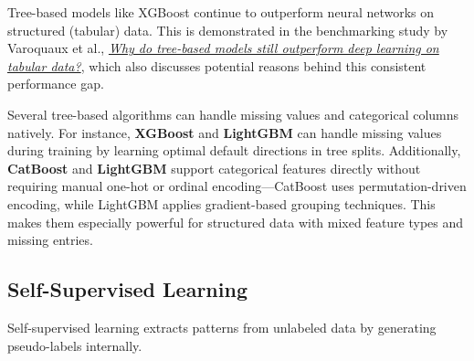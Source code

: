 \documentclass[12pt,openany, draft]{book}
\begin{document}
\begin{notebox}
    Tree-based models like XGBoost continue to outperform neural networks on structured (tabular) data. This is demonstrated in the benchmarking study by Varoquaux et al., \href{https://doi.org/10.48550/arXiv.2207.08815}{\textit{Why do tree-based models still outperform deep learning on tabular data?}}, which also discusses potential reasons behind this consistent performance gap.
\end{notebox}

\begin{notebox}
Several tree-based algorithms can handle missing values and categorical columns natively. For instance, \textbf{XGBoost} and \textbf{LightGBM} can handle missing values during training by learning optimal default directions in tree splits. Additionally, \textbf{CatBoost} and \textbf{LightGBM} support categorical features directly without requiring manual one-hot or ordinal encoding—CatBoost uses permutation-driven encoding, while LightGBM applies gradient-based grouping techniques. This makes them especially powerful for structured data with mixed feature types and missing entries.
\end{notebox}


\subsection{Self-Supervised Learning}

Self-supervised learning extracts patterns from unlabeled data by generating 
pseudo-labels internally.
\end{document}

